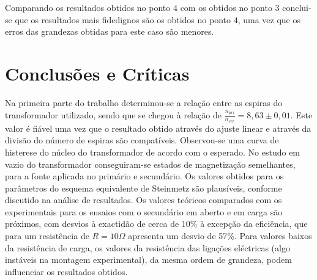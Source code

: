 \documentclass[%
  reprint,
  nofootinbib,
  amsmath,amssymb,
  aps,
  10pt,
]{revtex4-1}
\begin{document}
Comparando os resultados obtidos no ponto $4$ com os obtidos no ponto $3$ conclui-se que os resultados mais fidedignos são os obtidos no ponto $4$, uma vez que os erros das grandezas obtidas para este caso são menores.
\section{Conclusões e Críticas}
\label{s:conclu}
Na primeira parte do trabalho determinou-se a relação entre as espiras do transformador utilizado, sendo que se chegou à relação de $\frac{n_{pri}}{n_{sec}}=8,63\pm0,01$. Este valor é fiável uma vez que o resultado obtido através do ajuste linear e através da divisão do número de espiras são compatíveis.
Observou-se uma curva de histerese do núcleo do transformador de acordo com o esperado.  
No estudo em vazio do transformador conseguiram-se estados de magnetização semelhantes, para a fonte aplicada no primário e secundário. Os valores obtidos para os parâmetros do esquema equivalente de Steinmetz são plausíveis, conforme discutido na análise de resultados.
Os valores teóricos comparados com os experimentais para os ensaios com o secundário em aberto e em carga são próximos, com desvios à exactidão de cerca de 10\% à excepção da eficiência, que para um resistência de $R=10\Omega$ apresenta um desvio de 57\%. Para valores baixos da resistência de carga, os valores da resistência das ligações eléctricas (algo instáveis na montagem experimental), da mesma ordem de grandeza, podem influenciar os resultados obtidos.





\nocite{*}
{}
\end{document}
